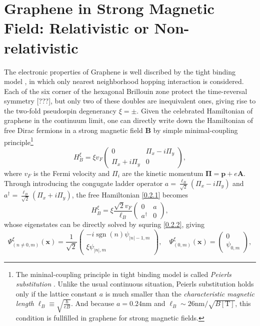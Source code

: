 \documentclass[bachelor,english,numbers]{ustcthesis}
\begin{document}
	\section{Graphene in Strong Magnetic Field: Relativistic or Non-relativistic}
		\indent\par The electronic properties of Graphene is well discribed by the tight binding model \cite{altland2010condensed}, in which only nearest neighborhood hopping interaction is considered. Each of the six corner of the hexagonal Brillouin zone protect the time-reversal symmetry [???], but only two of these doubles are inequivalent ones, giving rise to the two-fold pseudospin degenerancy $\xi=\pm$. Given the celebrated Hamiltonian of graphene in the continuum limit, one can directly write down the Hamiltonian of free Dirac fermions in a strong magnetic field $\bm{B}$ by simple minimal-coupling principle\footnote{The mininal-coupling principle in tight binding model is called \emph{Peierls substitution} \cite{goerbig2011electronic}. Unlike the usual continuous situation, Peierls substitution holds only if the lattice constant $a$ is much smaller than the \emph{characteristic magnetic length} $\ell_B\equiv\sqrt{\frac{\hbar}{eB}}$. And because $a=0.24\mathrm{nm}$ and $\ell_B\sim26\mathrm{nm}/\sqrt{B[\mathrm{T}]}$, this condition is fullfilled in graphene for strong magnetic fields.} 
		\begin{equation}\label{0.2.1}
			H^\xi_B=\xi v_F\left(\begin{array}{cc}
				0 & \Pi_x-i\Pi_y\\
				\Pi_x+i\Pi_y & 0
			\end{array}\right),
		\end{equation}
		where $v_F$ is the Fermi velocity and $\Pi_i$ are the kinetic momentum $\bm{\Pi}=\bm{p}+e\bm{A}$. Through introducing the congugate ladder operator $a=\frac{\ell_B}{\sqrt{2}}(\Pi_x-i\Pi_y)$ and $a^\dagger=\frac{\ell_B}{\sqrt{2}}(\Pi_x+i\Pi_y)$, the free Hamiltonian \eqref{0.2.1} becomes 
		\begin{equation}\label{0.2.2}
			H^\xi_B=\xi\dfrac{\sqrt{2}v_F}{\ell_B}\left(\begin{array}{cc}
				0 & a \\ a^\dagger & 0
			\end{array}\right),
		\end{equation}
		whose eigenstates can be directly solved by squring \eqref{0.2.2}, giving \cite{tHoke2006fractional,tHoke20074}
		\begin{equation}\label{0.2.3}
			\Psi^\xi_{(n\neq0,m)}(\bm{x})=\dfrac{1}{\sqrt{2}}\left(\begin{array}{c}
				-i\mathop{\mathrm{sgn}}{(n)}\psi_{|n|-1,m}\\
				\xi\psi_{|n|,m}
			\end{array}\right),\quad\Psi^\xi_{(0,m)}(\bm{x})=\left(\begin{array}{c}
				0\\
				\psi_{0,m}
			\end{array}\right),
		\end{equation}
\end{document}
